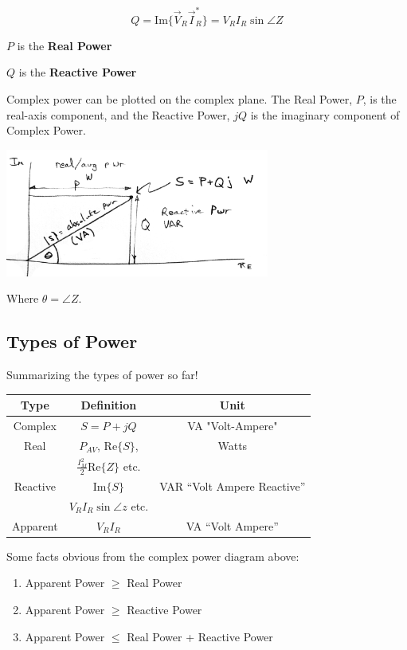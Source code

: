 \[
Q = \text{Im}\{\vec{V}_R \vec{I}_R^*\} = V_R I_R \sin \angle Z
\]

$P$ is the {\bf Real Power}

$Q$ is the {\bf Reactive Power}

Complex power can be plotted on the complex plane.  The Real Power, $P$, is
the real-axis component, and the Reactive Power, $jQ$ is the imaginary component
of Complex Power.

\vspace{0.25in}
\includegraphics[width=0.65\textwidth]{figsChapt03/A69D31.png}

Where $\theta = \angle{Z}$.

\subsection{Types of Power }
Summarizing the types of power so far!

\begin{center}
\begin{tabular}{|c|c|c|}
\hline
Type & Definition & Unit \\
\hline
Complex  & $S=P+jQ$   &  VA "Volt-Ampere"  \\
Real & $P_{AV}$, $\text{Re}\{S\}$, & Watts \\
 & $\frac{I_M^2}{2} \text{Re}\{Z\}$ etc. & \\
\hline
Reactive & $\text{Im}\{S\}$ & VAR ``Volt Ampere Reactive'' \\
 & $V_R I_R \sin \angle z$ etc. & \\
\hline
Apparent & $V_R I_R$ & VA ``Volt Ampere'' \\
\hline
\end{tabular}
\end{center}

Some facts obvious from the complex power diagram above:
\begin{enumerate}
\item Apparent Power $\geq$ Real Power
\item Apparent Power $\geq$ Reactive Power
\item Apparent Power $\leq$ Real Power + Reactive Power
\end{enumerate}








